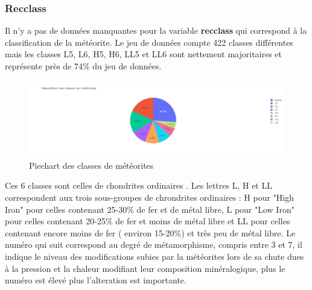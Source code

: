 \documentclass[12pt]{article}
\begin{document}
\subsubsection*{Recclass}
Il n'y a pas de données manquantes pour la variable \textbf{recclass} qui correspond à la classification de la météorite. Le jeu de données compte 422 classes différentes mais les classes L5, L6, H5, H6, LL5 et LL6 sont nettement majoritaires et représente près de 74\% du jeu de données.
\begin{figure}[H]
\centering
\includegraphics[width=15cm]{Images/exploration/recclass_piechart_class.png}
\caption{Piechart des classes de météorites}
\end{figure}
Ces 6 classes sont celles de chondrites ordinaires \cite{Classification_meteorites}. Les lettres L, H et LL correspondent aux trois sous-groupes de chrondrites ordinaires : H pour "High Iron" pour celles contenant 25-30\% de fer et de métal libre, L pour "Low Iron" pour celles contenant 20-25\% de fer et moins de métal libre et LL pour celles contenant encore moins de fer ( environ 15-20\%) et très peu de métal libre. Le numéro qui suit correspond au degré de métamorphisme, compris entre 3 et 7, il indique le niveau des modifications subies par la météorites lors de sa chute dues à la pression et la chaleur modifiant leur composition minéralogique, plus le numéro est élevé plus l'alteration est importante.
\end{document}
